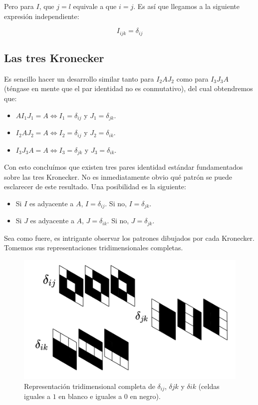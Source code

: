 \documentclass[a4paper, titlepage]{article}
\begin{document}
Pero para $I$, que $j = l$ equivale a que $i = j$. Es así que llegamos a la siguiente expresión independiente:

$$I_{ijk} = \delta_{ij}$$

\subsection{Las tres Kronecker}

Es sencillo hacer un desarrollo similar tanto para $I_2AJ_2$ como para $I_3J_3A$ (téngase en mente que el par identidad no es conmutativo), del cual obtendremos que:

\begin{itemize}
	\item $AI_1J_1 = A \Leftrightarrow I_1 = \delta_{ij}$ y $J_1 = \delta_{jk}$.
	\item $I_2AJ_2 = A \Leftrightarrow I_2 = \delta_{ij}$ y $J_2 = \delta_{ik}$.
	\item $I_3J_3A = A \Leftrightarrow I_3 = \delta_{jk}$ y $J_3 = \delta_{ik}$.
\end{itemize}

Con esto concluímos que existen tres pares identidad estándar fundamentados sobre las tres Kronecker. No es inmediatamente obvio qué patrón se puede esclarecer de este resultado. Una posibilidad es la siguiente:

\begin{itemize}
	\item Si $I$ es adyacente a $A$, $I = \delta_{ij}$. Si no, $I = \delta_{jk}$.
	\item Si $J$ es adyacente a $A$, $J = \delta_{ik}$. Si no, $J = \delta_{jk}$.
\end{itemize}

Sea como fuere, es intrigante observar los patrones dibujados por cada Kronecker. Tomemos sus representaciones tridimensionales completas.


\begin{figure}[H]
	\includegraphics[width=\linewidth]{kroneckers.png}
	\caption{Representación tridimensional completa de $\delta_{ij}$, $\delta{jk}$ y $\delta{ik}$ (celdas iguales a $1$ en blanco e iguales a $0$ en negro).}
\end{figure}
\end{document}
